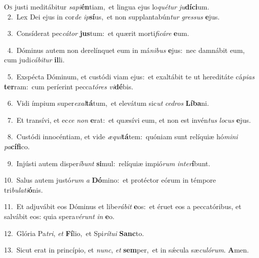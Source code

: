 \lettrine{\initial\textcolor{\initialcolor}{O}}{s} justi meditábitur \textit{sa}\-\textit{pi}\textbf{én}tiam,~\star et lingua ejus lo\-\textit{qué}\-\textit{tur} \textit{ju}\-\textbf{dí}\textbf{ci}um.\\
{\numbfont\textcolor{\numbcolor}{~2.}}~Lex Dei ejus in cor\textit{de} \textit{ip}\-\textbf{sí}us,~\star et non supplantabún\textit{tur} \textit{gres}\-\textit{sus} \textbf{e}\-jus.\par
{\numbfont\textcolor{\numbcolor}{~3.}}~Consíderat pec\-\textit{cá}\-\textit{tor} \textbf{jus}\-tum:~\star et quærit morti\-\textit{fi}\-\textit{cá}\textit{re} \textbf{e}\-um.\par
{\numbfont\textcolor{\numbcolor}{~4.}}~Dóminus autem non derelínquet eum in má\-\textit{ni}\-\textit{bus} \textbf{e}\-jus:~\star nec damnábit eum, cum judi\-\textit{cá}\-\textit{bi}\textit{tur} \textbf{il}\-li.\par
{\numbfont\textcolor{\numbcolor}{~5.}}~Exspécta Dóminum, et custódi viam ejus:~\dagger et exaltábit te ut hereditáte cá\-\textit{pi}\-\textit{as} \textbf{ter}\-ram:~\star cum períerint pecca\-\textit{tó}\-\textit{res} \textit{vi}\-\textbf{dé}bis.\par
{\numbfont\textcolor{\numbcolor}{~6.}}~Vidi ímpium super\-\textit{ex}\-\textit{al}\textbf{tá}tum,~\star et elevátum sic\textit{ut} \textit{ce}\-\textit{dros} \textbf{Lí}\-\textbf{ba}ni.\par
{\numbfont\textcolor{\numbcolor}{~7.}}~Et transívi, et ec\textit{ce} \textit{non} \textbf{e}\-rat:~\star et quæsívi eum, et non est invén\textit{tus} \textit{lo}\-\textit{cus} \textbf{e}\-jus.\par
{\numbfont\textcolor{\numbcolor}{~8.}}~Custódi innocéntiam, et vide \textit{æ}\-\textit{qui}\textbf{tá}tem:~\star quóniam sunt relíquiæ hó\-\textit{mi}\-\textit{ni} \textit{pa}\-\textbf{cí}\textbf{fi}co.\par
{\numbfont\textcolor{\numbcolor}{~9.}}~Injústi autem disper\-\textit{í}\-\textit{bunt} \textbf{si}\-mul:~\star relíquiæ impió\textit{rum} \textit{in}\-\textit{ter}\textbf{í}bunt.\par
{\numbfont\textcolor{\numbcolor}{10.}}~Salus autem justó\textit{rum} \textit{a} \textbf{Dó}\-mino:~\star et protéctor eórum in témpore tri\-\textit{bu}\-\textit{la}\textit{ti}\textbf{ó}nis.\par
{\numbfont\textcolor{\numbcolor}{11.}}~Et adjuvábit eos Dóminus et libe\-\textit{rá}\-\textit{bit} \textbf{e}\-os:~\star et éruet eos a peccatóribus, et salvábit eos: quia spera\-\textit{vé}\-\textit{runt} \textit{in} \textbf{e}\-o.\par
{\numbfont\textcolor{\numbcolor}{12.}}~Glória Pa\-\textit{tri}\-, \textit{et} \textbf{Fí}\-lio,~\star et Spi\-\textit{rí}\-\textit{tu}\textit{i} \textbf{Sanc}\-to.\par
{\numbfont\textcolor{\numbcolor}{13.}}~Sicut erat in princípio, et \textit{nunc}\-, \textit{et} \textbf{sem}\-per,~\star et in sǽcula sæ\-\textit{cu}\-\textit{ló}\textit{rum}. \textbf{A}\-men.\par
